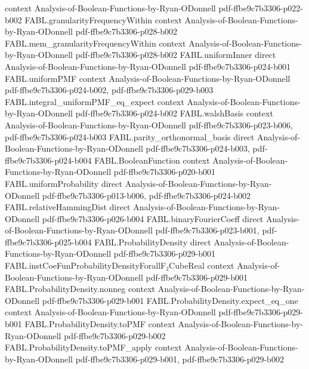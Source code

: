 \begin{theorem}
  {context}
  {Analysis-of-Boolean-Functions-by-Ryan-ODonnell}
  {pdf-ffbe9c7b3306-p022-b002}
\proofstep
  {FABL.granularityFrequencyWithin}
  {context}
  {Analysis-of-Boolean-Functions-by-Ryan-ODonnell}
  {pdf-ffbe9c7b3306-p028-b002}
\proofstep
  {FABL.mem_granularityFrequencyWithin}
  {context}
  {Analysis-of-Boolean-Functions-by-Ryan-ODonnell}
  {pdf-ffbe9c7b3306-p028-b002}
\proofstep
  {FABL.uniformInner}
  {direct}
  {Analysis-of-Boolean-Functions-by-Ryan-ODonnell}
  {pdf-ffbe9c7b3306-p024-b001}
\proofstep
  {FABL.uniformPMF}
  {context}
  {Analysis-of-Boolean-Functions-by-Ryan-ODonnell}
  {pdf-ffbe9c7b3306-p024-b002,
    pdf-ffbe9c7b3306-p029-b003}
\proofstep
  {FABL.integral_uniformPMF_eq_expect}
  {context}
  {Analysis-of-Boolean-Functions-by-Ryan-ODonnell}
  {pdf-ffbe9c7b3306-p024-b002}
\proofstep
  {FABL.walshBasis}
  {context}
  {Analysis-of-Boolean-Functions-by-Ryan-ODonnell}
  {pdf-ffbe9c7b3306-p023-b006,
    pdf-ffbe9c7b3306-p024-b003}
\proofstep
  {FABL.parity_orthonormal_basis}
  {direct}
  {Analysis-of-Boolean-Functions-by-Ryan-ODonnell}
  {pdf-ffbe9c7b3306-p024-b003,
    pdf-ffbe9c7b3306-p024-b004}
\proofstep
  {FABL.BooleanFunction}
  {context}
  {Analysis-of-Boolean-Functions-by-Ryan-ODonnell}
  {pdf-ffbe9c7b3306-p020-b001}
\proofstep
  {FABL.uniformProbability}
  {direct}
  {Analysis-of-Boolean-Functions-by-Ryan-ODonnell}
  {pdf-ffbe9c7b3306-p013-b006,
    pdf-ffbe9c7b3306-p024-b002}
\proofstep
  {FABL.relativeHammingDist}
  {direct}
  {Analysis-of-Boolean-Functions-by-Ryan-ODonnell}
  {pdf-ffbe9c7b3306-p026-b004}
\proofstep
  {FABL.binaryFourierCoeff}
  {direct}
  {Analysis-of-Boolean-Functions-by-Ryan-ODonnell}
  {pdf-ffbe9c7b3306-p023-b001,
    pdf-ffbe9c7b3306-p025-b004}
\proofstep
  {FABL.ProbabilityDensity}
  {direct}
  {Analysis-of-Boolean-Functions-by-Ryan-ODonnell}
  {pdf-ffbe9c7b3306-p029-b001}
\proofstep
  {FABL.instCoeFunProbabilityDensityForallF₂CubeReal}
  {context}
  {Analysis-of-Boolean-Functions-by-Ryan-ODonnell}
  {pdf-ffbe9c7b3306-p029-b001}
\proofstep
  {FABL.ProbabilityDensity.nonneg}
  {context}
  {Analysis-of-Boolean-Functions-by-Ryan-ODonnell}
  {pdf-ffbe9c7b3306-p029-b001}
\proofstep
  {FABL.ProbabilityDensity.expect_eq_one}
  {context}
  {Analysis-of-Boolean-Functions-by-Ryan-ODonnell}
  {pdf-ffbe9c7b3306-p029-b001}
\proofstep
  {FABL.ProbabilityDensity.toPMF}
  {context}
  {Analysis-of-Boolean-Functions-by-Ryan-ODonnell}
  {pdf-ffbe9c7b3306-p029-b002}
\proofstep
  {FABL.ProbabilityDensity.toPMF_apply}
  {context}
  {Analysis-of-Boolean-Functions-by-Ryan-ODonnell}
  {pdf-ffbe9c7b3306-p029-b001,
    pdf-ffbe9c7b3306-p029-b002}

\end{theorem}
